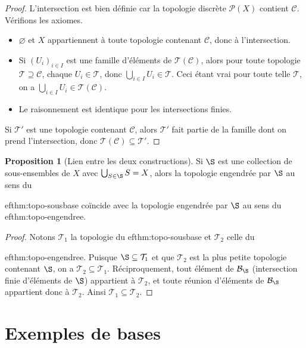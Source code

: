 \documentclass[12pt,a4paper,openany]{book}
\theoremstyle{definition}
\theoremstyle{cours}
\newtheorem{proposition}[theoreme]{Proposition}
\theoremstyle{coursnormal}
\newcommand{\T}{\mathcal{T}}
\newcommand{\B}{\mathcal{B}}
\begin{document}
\begin{proof}
  L'intersection est bien définie car la topologie discrète
  $\mathcal{P}(X)$ contient $\mathcal{C}$. Vérifions les axiomes.
  \begin{itemize}
    \item $\varnothing$ et $X$ appartiennent à toute topologie contenant
      $\mathcal{C}$, donc à l'intersection.
    \item Si $(U_i)_{i\in I}$ est une famille d'éléments de
      $\T(\mathcal{C})$, alors pour toute topologie $\T\supseteq\mathcal{C}$,
      chaque $U_i\in\T$, donc $\bigcup_{i\in I} U_i\in\T$. Ceci étant vrai
      pour toute telle $\T$, on a $\bigcup_{i\in I} U_i\in\T(\mathcal{C})$.
    \item Le raisonnement est identique pour les intersections finies.
  \end{itemize}
  Si $\T'$ est une topologie contenant $\mathcal{C}$, alors $\T'$ fait
  partie de la famille dont on prend l'intersection, donc
  $\T(\mathcal{C})\subseteq\T'$.
\end{proof}

\begin{proposition}[Lien entre les deux constructions]\label{prop:lien-sousbase-engendree}
  Si $\S$ est une collection de sous-ensembles de $X$ avec
  $\bigcup_{S\in\S}S=X$, alors la topologie engendrée par $\S$ au sens du
  
ef{thm:topo-sousbase} coïncide avec la topologie engendrée par $\S$ au
  sens du 
ef{thm:topo-engendree}.
\end{proposition}

\begin{proof}
  Notons $\T_1$ la topologie du 
ef{thm:topo-sousbase} et $\T_2$ celle du
  
ef{thm:topo-engendree}. Puisque $\S\subseteq\T_1$ et que $\T_2$ est la
  plus petite topologie contenant $\S$, on a $\T_2\subseteq\T_1$. Réciproquement,
  tout élément de $\B_{\S}$ (intersection finie d'éléments de $\S$) appartient
  à $\T_2$, et toute réunion d'éléments de $\B_{\S}$ appartient donc à $\T_2$.
  Ainsi $\T_1\subseteq\T_2$.
\end{proof}

\section{Exemples de bases}\label{sec:exemples-bases}
\end{document}
